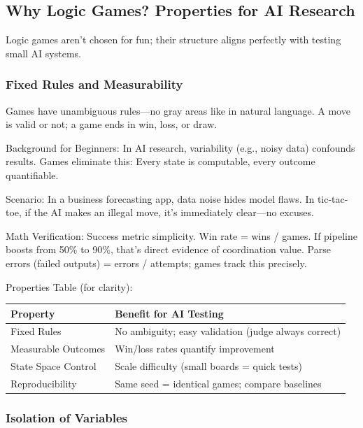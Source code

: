 \documentclass[
]{article}
\begin{document}
\subsection{Why Logic Games? Properties for AI
Research}\label{why-logic-games-properties-for-ai-research}

Logic games aren't chosen for fun; their structure aligns perfectly with
testing small AI systems.

\subsubsection{Fixed Rules and
Measurability}\label{fixed-rules-and-measurability}

Games have unambiguous rules---no gray areas like in natural language. A
move is valid or not; a game ends in win, loss, or draw.

Background for Beginners: In AI research, variability (e.g., noisy data)
confounds results. Games eliminate this: Every state is computable,
every outcome quantifiable.

Scenario: In a business forecasting app, data noise hides model flaws.
In tic-tac-toe, if the AI makes an illegal move, it's immediately
clear---no excuses.

Math Verification: Success metric simplicity. Win rate = wins / games.
If pipeline boosts from 50\% to 90\%, that's direct evidence of
coordination value. Parse errors (failed outputs) = errors / attempts;
games track this precisely.

Properties Table (for clarity):

\begin{longtable}[]{@{}ll@{}}
\toprule\noalign{}
Property & Benefit for AI Testing \\
\midrule\noalign{}
\endhead
\bottomrule\noalign{}
\endlastfoot
Fixed Rules & No ambiguity; easy validation (judge always correct) \\
Measurable Outcomes & Win/loss rates quantify improvement \\
State Space Control & Scale difficulty (small boards = quick tests) \\
Reproducibility & Same seed = identical games; compare baselines \\
\end{longtable}

\subsubsection{Isolation of Variables}\label{isolation-of-variables}
\end{document}
